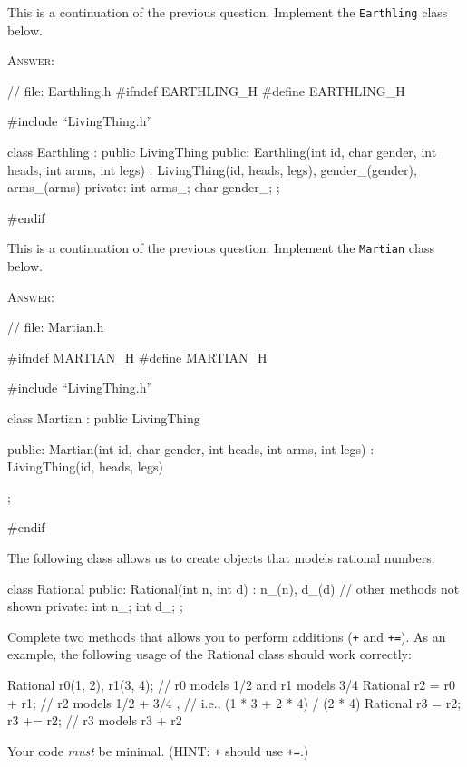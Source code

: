 \newpage
\nextq
This is a continuation of the previous question.
Implement the \verb!Earthling! class below.

\textsc{Answer:}
\begin{answercode}
// file: Earthling.h
#ifndef EARTHLING_H
#define EARTHLING_H

#include ``LivingThing.h''

class Earthling : public LivingThing
{
  public:
  Earthling(int id, char gender, int heads, int arms, int legs)
  : LivingThing(id, heads, legs), gender_(gender), arms_(arms)
  {}
  private:
  int arms_;
  char gender_;
};

#endif
\end{answercode}

\newpage
\nextq
This is a continuation of the previous question.
Implement the \verb!Martian! class below.

\textsc{Answer:}
\begin{answercode}
// file: Martian.h

#ifndef MARTIAN_H
#define MARTIAN_H

#include ``LivingThing.h''

class Martian : public LivingThing
{
  public:
  Martian(int id, char gender, int heads, int arms, int legs)
  : LivingThing(id, heads, legs)
  {}
  
};

#endif

\end{answercode}

\newpage
\nextq
The following class allows us to create objects that models rational numbers:
\begin{console}
class Rational
{
public:
    Rational(int n, int d)
        : n_(n), d_(d)
    {}
    // other methods not shown
private:
    int n_;
    int d_;
};
\end{console}
Complete two methods that allows you to perform additions
(\verb!+! and \verb!+=!).
As an example, the following usage of the Rational class should work correctly:
\begin{console}
Rational r0(1, 2), r1(3, 4); // r0 models 1/2 and r1 models 3/4
Rational r2 = r0 + r1;       // r2 models 1/2 + 3/4 , 
                             // i.e., (1 * 3 + 2 * 4) / (2 * 4)
Rational r3 = r2;
r3 += r2;                    // r3 models r3 + r2
\end{console}
Your code \textit{must} be minimal.
(HINT: \verb!+! should use \verb!+=!.)

